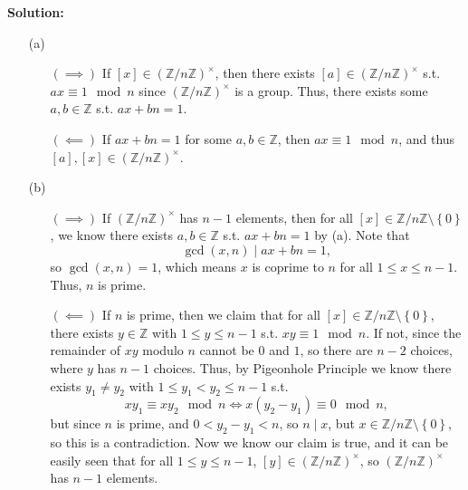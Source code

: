 \begin{enumerate}
\begin{enumerate}
    \end{enumerate}
    \textbf{Solution:} \vphantom{text}
    \begin{itemize}
        \item [(a)] 
        \begin{itemize}
            \item [\((\implies )\)] If \([x] \in (\mathbb{Z} / n \mathbb{Z})^{\times} \), then there exists \([a] \in (\mathbb{Z} / n \mathbb{Z})^{\times } \) s.t. \(a x \equiv 1 \mod{n}\) since \((\mathbb{Z} / n \mathbb{Z})^{\times } \) is a group. Thus, there exists some \(a, b \in \mathbb{Z} \) s.t. \(ax + bn = 1\). 
            \item [\((\impliedby )\)] If \(ax + bn = 1\) for some \(a, b \in \mathbb{Z} \), then \(ax \equiv 1 \mod{n}\), and thus \([a], [x] \in (\mathbb{Z} / n \mathbb{Z})^{\times } \).          
        \end{itemize}
        \item [(b)] 
        \begin{itemize}
            \item [\((\implies )\)] If \((\mathbb{Z} / n \mathbb{Z} )^{\times }\) has \(n-1\) elements, then for all \([x] \in \mathbb{Z} / n \mathbb{Z} \setminus \left\{ 0 \right\} \), we know there exists \(a, b \in \mathbb{Z} \) s.t. \(ax + bn = 1\) by (a). Note that 
            \[
                \gcd(x, n) \mid ax + bn = 1,
            \]  so \(\gcd(x, n) = 1\), which means \(x\) is coprime to \(n\) for all \(1 \le x \le n-1\). Thus, \(n\) is prime.    
            \item [\((\impliedby )\)] If \(n\) is prime, then we claim that for all \([x] \in \mathbb{Z} / n \mathbb{Z} \setminus \left\{ 0 \right\} \), there exists \(y \in \mathbb{Z} \) with \(1 \le y \le n-1\) s.t. \(xy \equiv 1 \mod{n}\). If not, since the remainder of \(xy\) modulo \(n\) cannot be \(0\) and \(1\), so there are \(n-2\) choices, where \(y\) has \(n-1\) choices. Thus, by Pigeonhole Principle we know there exists \(y_1 \neq y_2\) with \(1 \le y_1 < y_2 \le n-1\) s.t. 
            \[
                x y_1 \equiv x y_2 \mod{n} \iff x(y_2 - y_1) \equiv 0 \mod{n},
            \] but since \(n\) is prime, and \(0 < y_2 - y_1 < n\), so \(n \mid x\), but \(x \in \mathbb{Z} / n \mathbb{Z} \setminus \left\{ 0 \right\} \), so this is a contradiction. Now we know our claim is true, and it can be easily seen that for all \(1 \le y \le n-1\), \([y] \in (\mathbb{Z} / n \mathbb{Z} )^{\times }\), so \((\mathbb{Z} / n \mathbb{Z} )^{\times }\) has \(n-1\) elements.     
        \end{itemize}
    \end{itemize} 
    \vphantom{text}


\end{enumerate}
